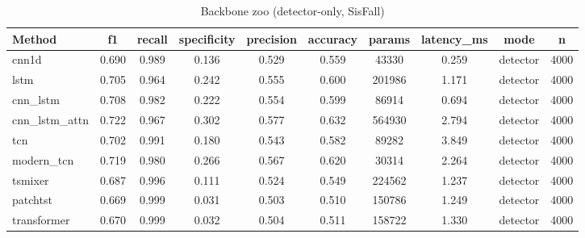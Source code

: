 \begin{table}[t]
\centering
\caption{Backbone zoo (detector-only, SisFall)}
\begin{tabular}{lccccccccc}
\toprule
Method & f1 & recall & specificity & precision & accuracy & params & latency_ms & mode & n \\
\midrule
cnn1d & 0.690 & 0.989 & 0.136 & 0.529 & 0.559 & 43330 & 0.259 & detector & 4000 \\
lstm & 0.705 & 0.964 & 0.242 & 0.555 & 0.600 & 201986 & 1.171 & detector & 4000 \\
cnn_lstm & 0.708 & 0.982 & 0.222 & 0.554 & 0.599 & 86914 & 0.694 & detector & 4000 \\
cnn_lstm_attn & 0.722 & 0.967 & 0.302 & 0.577 & 0.632 & 564930 & 2.794 & detector & 4000 \\
tcn & 0.702 & 0.991 & 0.180 & 0.543 & 0.582 & 89282 & 3.849 & detector & 4000 \\
modern_tcn & 0.719 & 0.980 & 0.266 & 0.567 & 0.620 & 30314 & 2.264 & detector & 4000 \\
tsmixer & 0.687 & 0.996 & 0.111 & 0.524 & 0.549 & 224562 & 1.237 & detector & 4000 \\
patchtst & 0.669 & 0.999 & 0.031 & 0.503 & 0.510 & 150786 & 1.249 & detector & 4000 \\
transformer & 0.670 & 0.999 & 0.032 & 0.504 & 0.511 & 158722 & 1.330 & detector & 4000 \\
\bottomrule
\end{tabular}
\end{table}